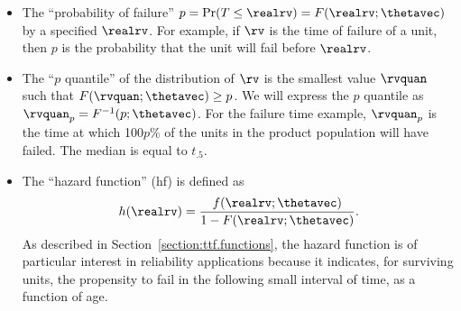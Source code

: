 \begin{itemize}
\item
The ``probability of failure'' 
$p=\Pr(T \leq \realrv)= F(\realrv;\thetavec)$ by a
specified $\realrv$. For
example, if $\rv$ is the time of failure of a unit, then
$p$ is the probability that the unit will fail before $\realrv$.
\item
The ``$p$ quantile'' of the distribution of $\rv$ is the smallest
value $\rvquan$ such that $F(\rvquan;\thetavec) \ge p$. We will
express the $p$ quantile as $\rvquan_{p}=F^{-1}(p;\thetavec)$. For the
failure time example, $\rvquan_{p}$ is the time at which 100$p$\% of
the units in the product population will have failed. The median is
equal to $t_{.5}$.
\item
The ``hazard function''  (hf) is defined as
\begin{equation}
\label{equation:hazard.definition}
h(\realrv)=\frac{f(\realrv;\thetavec)}
{1-F(\realrv;\thetavec)}.
\end{equation}
As described in Section~\ref{section:ttf.functions}, the hazard
function is of particular interest in reliability applications because
it indicates, for surviving units, the propensity to fail in the following
small interval of time, as a function of age.


\end{itemize}
